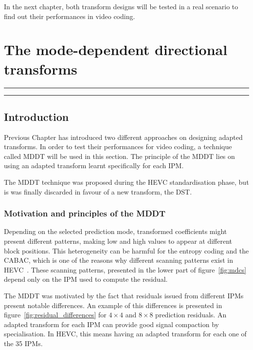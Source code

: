 \documentclass[11pt,a4paper,openright,twoside]{book}
\providecommand{\chaptertoc}{
	\startcontents[chapters]
	\hrule
	\vspace{1em}
	\printcontents[chapters]{}{1}{{\bf\large Contents}}
	\hrule
}
\numberwithin{equation}{section} %
\numberwithin{figure}{section} %
\numberwithin{table}{section} %
\begin{document}
In the next chapter, both transform designs will be tested in a real
scenario to find out their performances in video coding.


\chapter{The mode-dependent directional transforms}
\label{cha:mddt}
\chaptertoc

\section{Introduction}
\label{sec:mddt_introduction}

Previous Chapter has introduced two different approaches on designing adapted
transforms.
In order to test their performances for video coding, a technique called
\ac{MDDT} will be used in this section.
The principle of the \ac{MDDT} lies on using an adapted transform learnt
specifically for each \acf{IPM}.

The \ac{MDDT} technique was proposed during the \ac{HEVC} standardisation
phase, but is was finally discarded in favour of a new transform, the
\ac{DST}.

\subsection{Motivation and principles of the \acs{MDDT}}
\label{sub:mddt_motivation}

Depending on the selected prediction mode, transformed coefficients might
present different patterns, making low and high values to appear at different
block positions.
This heterogeneity can be harmful for the entropy coding and the
\ac{CABAC}, which is one of the reasons why different scanning patterns exist
in \ac{HEVC}~\cite{sole-12-transform-coefficient-coding}.
These scanning patterns, presented in the lower part of
figure~\ref{fig:mdcs} depend only on the \ac{IPM} used to compute the
residual.

The \ac{MDDT} was motivated by the fact that residuals issued from different
\acp{IPM} present notable differences.
An example of this differences is presented in
figure~\ref{fig:residual_differences} for $4\times4$ and $8\times8$ prediction
residuals.
An adapted transform for each \ac{IPM} can provide good signal compaction by
specialisation.
In \ac{HEVC}, this means having an adapted transform for each one of the 35
\acp{IPM}.
\end{document}

